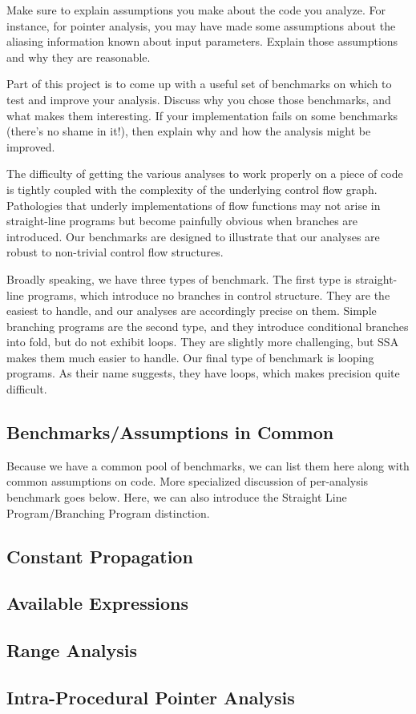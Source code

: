 \documentclass{article}
\theoremstyle{definition}
\begin{document}
\begin{framed}
  Make sure to explain assumptions you make about the code you
  analyze. For instance, for pointer analysis, you may have made some
  assumptions about the aliasing information known about input
  parameters. Explain those assumptions and why they are reasonable.

  Part of this project is to come up with a useful set of benchmarks
  on which to test and improve your analysis. Discuss why you chose
  those benchmarks, and what makes them interesting. If your
  implementation fails on some benchmarks (there's no shame in it!),
  then explain why and how the analysis might be improved.
\end{framed}

The difficulty of getting the various analyses to work properly on a
piece of code is tightly coupled with the complexity of the underlying
control flow graph. Pathologies that underly implementations of flow
functions may not arise in straight-line programs but become painfully
obvious when branches are introduced. Our benchmarks are designed to
illustrate that our analyses are robust to non-trivial control flow
structures.

Broadly speaking, we have three types of benchmark. The first type is
straight-line programs, which introduce no branches in control
structure. They are the easiest to handle, and our analyses are
accordingly precise on them. Simple branching programs are the second
type, and they introduce conditional branches into fold, but do not
exhibit loops. They are slightly more challenging, but SSA makes them
much easier to handle. Our final type of benchmark is looping
programs. As their name suggests, they have loops, which makes
precision quite difficult.

\subsection{Benchmarks/Assumptions in Common}
Because we have a common pool of benchmarks, we can list them here
along with common assumptions on code. More specialized discussion of
per-analysis benchmark goes below. Here, we can also introduce the
Straight Line Program/Branching Program distinction.

\subsection{Constant Propagation}
\subsection{Available Expressions}
\subsection{Range Analysis}
\subsection{Intra-Procedural Pointer Analysis}
\end{document}
